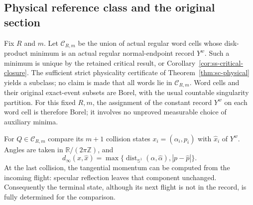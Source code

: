 \subsection{Physical reference class and the original section}
Fix $R$ and $m$. Let $\mathcal C_{R,m}$ be the union of actual regular
word cells whose disk-product minimum is an actual regular
normal-endpoint record $Y^w$. Such a minimum is unique by the retained
critical result, or Corollary~\ref{cor:ss-critical-closure}.
The sufficient strict physicality certificate of
Theorem~\ref{thm:sc-physical} yields a subclass; no claim is made that
all words lie in $\mathcal C_{R,m}$. Word cells and their original
exact-event subsets are Borel, with the usual countable
singularity partition. For this fixed $R,m$, the assignment of the
constant record $Y^w$ on each word cell is therefore Borel; it involves
no unproved measurable choice of auxiliary minima.

For $Q\in\mathcal C_{R,m}$ compare its $m+1$ collision states
$x_i=(\alpha_i,p_i)$ with $\widehat x_i$ of $Y^w$. Angles are taken
in $\mathbb R/(2\pi\mathbb Z)$, and
\[
 d_\infty(x,\widehat x)=
 \max\{\operatorname{dist}_{\mathbb S^1}(\alpha,\widehat\alpha),
                                      |p-\widehat p|\}.
\]
At the last collision, the tangential momentum can be computed from
the incoming flight: specular reflection leaves that component
unchanged. Consequently the terminal state, although its next flight
is not in the record, is fully determined for the comparison.

